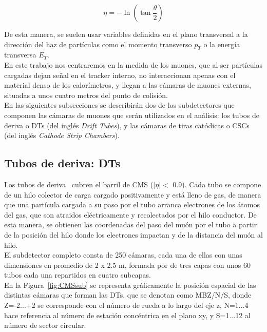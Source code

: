 \begin{equation}
  \eta = -\ln\left(\tan\dfrac{\theta}{2}\right)
\label{eq:eta}
\end{equation}


De esta manera, se suelen usar variables definidas en el plano transversal a la dirección del haz de partículas como el momento transverso $p_{T}$ o la energía transversa $E_{T}$. \\

En este trabajo nos centraremos en la medida de los muones, que al ser part\'iculas cargadas dejan se\~nal en el tracker interno, no interaccionan apenas con el material denso de los calor\'imetros, y llegan a las c\'amaras de muones externas, situadas a unos cuatro metros del punto de colisi\'on. \\
En las siguientes subsecciones se describir\'an dos de los subdetectores que componen las c\'amaras de muones que ser\'an utilizados en el an\'alisis: los tubos de deriva o DTs (del ingl\'es \textit{Drift Tubes}), y las c\'amaras de tiras cat\'odicas o CSCs (del ingl\'es \textit{Cathode Strip Chambers}).

\subsection{Tubos de deriva: DTs}\label{sec:DTs}

Los tubos de deriva~\cite{DTperformance} cubren el barril de CMS ($\lvert \eta \rvert <$ 0.9). Cada tubo se compone de un hilo colector de carga cargado positivamente y est\'a lleno de gas, de manera que una part\'icula cargada a su paso por el tubo arranca electrones de los \'atomos del gas, que son atraidos el\'ectricamente y recolectados por el hilo conductor. De esta manera, se obtienen las coordenadas del paso del mu\'on por el tubo a partir de la posici\'on del hilo donde los electrones impactan y de la distancia del mu\'on al hilo. \\

El subdetector completo consta de 250 c\'amaras, cada una de ellas con unas dimensiones en promedio de 2 x 2.5 m, formada por de tres capas con unos 60 tubos cada una repartidos en cuatro subcapas. \\
En la Figura~\ref{fig:CMSsub} se representa gr\'aficamente la posici\'on espacial de las distintas c\'amaras que forman las DTs, que se denotan como MBZ/N/S, donde Z=-2...+2 se corresponde con el n\'umero de rueda a lo largo del eje z, N=1...4 hace referencia al n\'umero de estaci\'on conc\'entrica en el plano xy, y S=1...12 al n\'umero de sector circular. 


